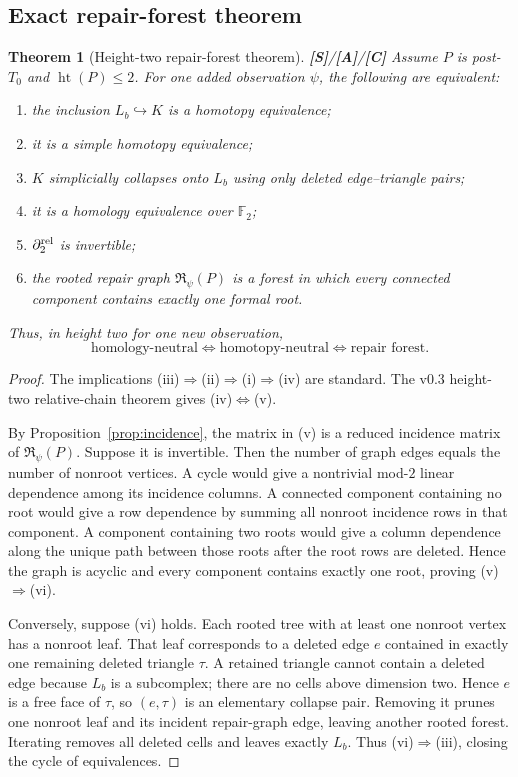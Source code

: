 \documentclass[11pt]{article}
\newtheorem{theorem}{Theorem}[section]
\theoremstyle{definition}
\newcommand{\F}{\mathbb F_2}
\newcommand{\statusS}{\textbf{[S]}}
\newcommand{\statusA}{\textbf{[A]}}
\newcommand{\statusC}{\textbf{[C]}}
\begin{document}
\subsection{Exact repair-forest theorem}

\begin{theorem}[Height-two repair-forest theorem]\label{thm:repairforest}
\statusS/\statusA/\statusC\;
Assume $P$ is post-$T_0$ and $\operatorname{ht}(P)\le2$. For one added observation $\psi$, the following are equivalent:
\begin{enumerate}[label=(\roman*)]
\item the inclusion $L_b\hookrightarrow K$ is a homotopy equivalence;
\item it is a simple homotopy equivalence;
\item $K$ simplicially collapses onto $L_b$ using only deleted edge--triangle pairs;
\item it is a homology equivalence over $\F$;
\item $\partial_2^{\rm rel}$ is invertible;
\item the rooted repair graph $\mathfrak R_\psi(P)$ is a forest in which every connected component contains exactly one formal root.
\end{enumerate}
Thus, in height two for one new observation,
\[
\boxed{\text{homology-neutral}\iff\text{homotopy-neutral}\iff\text{repair forest}.}
\]
\end{theorem}

\begin{proof}
The implications (iii)$\Rightarrow$(ii)$\Rightarrow$(i)$\Rightarrow$(iv) are standard. The v0.3 height-two relative-chain theorem gives (iv)$\Leftrightarrow$(v).

By Proposition~\ref{prop:incidence}, the matrix in (v) is a reduced incidence matrix of $\mathfrak R_\psi(P)$. Suppose it is invertible. Then the number of graph edges equals the number of nonroot vertices. A cycle would give a nontrivial mod-$2$ linear dependence among its incidence columns. A connected component containing no root would give a row dependence by summing all nonroot incidence rows in that component. A component containing two roots would give a column dependence along the unique path between those roots after the root rows are deleted. Hence the graph is acyclic and every component contains exactly one root, proving (v)$\Rightarrow$(vi).

Conversely, suppose (vi) holds. Each rooted tree with at least one nonroot vertex has a nonroot leaf. That leaf corresponds to a deleted edge $e$ contained in exactly one remaining deleted triangle $\tau$. A retained triangle cannot contain a deleted edge because $L_b$ is a subcomplex; there are no cells above dimension two. Hence $e$ is a free face of $\tau$, so $(e,\tau)$ is an elementary collapse pair. Removing it prunes one nonroot leaf and its incident repair-graph edge, leaving another rooted forest. Iterating removes all deleted cells and leaves exactly $L_b$. Thus (vi)$\Rightarrow$(iii), closing the cycle of equivalences.
\end{proof}
\end{document}
